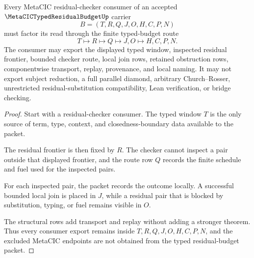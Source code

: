 \begin{theorem}
\label{thm:metacic-typed-residual-budget-residual-checker-route}
Every MetaCIC residual-checker consumer of an accepted $\MetaCICTypedResidualBudgetUp$ carrier
$$
B=(T,R,Q,J,O,H,C,P,N)
$$
must factor its read through the finite typed-budget route
$$
T \longmapsto R \longmapsto Q \longmapsto J,O \longmapsto H,C,P,N .
$$
The consumer may export the displayed typed window, inspected residual frontier, bounded checker route, local join rows, retained obstruction rows, componentwise transport, replay, provenance, and local naming. It may not export subject reduction, a full parallel diamond, arbitrary Church--Rosser, unrestricted residual-substitution compatibility, Lean verification, or bridge checking.
\end{theorem}
\begin{proof}
Start with a residual-checker consumer. The typed window $T$ is the only source of term, type, context, and closedness-boundary data available to the packet.

The residual frontier is then fixed by $R$. The checker cannot inspect a pair outside that displayed frontier, and the route row $Q$ records the finite schedule and fuel used for the inspected pairs.

For each inspected pair, the packet records the outcome locally. A successful bounded local join is placed in $J$, while a residual pair that is blocked by substitution, typing, or fuel remains visible in $O$.

The structural rows add transport and replay without adding a stronger theorem. Thus every consumer export remains inside $T,R,Q,J,O,H,C,P,N$, and the excluded MetaCIC endpoints are not obtained from the typed residual-budget packet.
\end{proof}



